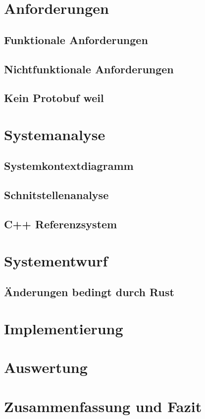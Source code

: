 \documentclass[
	12pt,
	table,
	bigheadings,
	ngerman,
	a4paper,
	BCOR5mm,
	DIV14,
	1.1headlines,
	pagesize,
	oneside,
	openright,
	titlepage,
	headsepline,
	nochapterprefix,
	bibtotoc,
	tocindent,
	listsindent,
	pointlessnumbers,
	cleardoubleempty,
	fleqn,
	halfparskip
]{scrbook}
\begin{document}
	
	\chapter{Anforderungen}
		\section{Funktionale Anforderungen}
		\section{Nichtfunktionale Anforderungen}
		\section{Kein Protobuf weil}
	
	\chapter{Systemanalyse}
		\section{Systemkontextdiagramm}
		\section{Schnitstellenanalyse}
		\section{C++ Referenzsystem}
		
	\chapter{Systementwurf}
		\section{Änderungen bedingt durch Rust}
	
	\chapter{Implementierung}
	\chapter{Auswertung}
	\chapter{Zusammenfassung und Fazit}
	
	
	
	
	\clearpage
	\printbibliography
	
	\clearpage
	\printglossaries

	\clearpage
	\listoffigures
	
	
\end{document}

